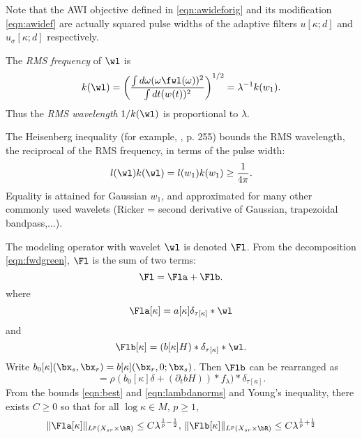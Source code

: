 Note that the AWI objective defined in \ref{eqn:awideforig} and its
modification \ref{eqn:awidef} are actually
squared pulse widths of the adaptive filters $u[\kappa;d]$ and
$u_{\sigma}[\kappa;d]$ respectively.

The {\em RMS frequency} of $\wl$ is
\begin{equation}
  \label{eqn:freq}
  k(\wl) = \left(\frac{\int d\omega (\omega \fwl(\omega))^2}{\int dt (w(t))^2} \right)^{1/2} = \lambda^{-1}k(w_1).
\end{equation}
Thus the {\em RMS wavelength} $1/k(\wl)$ is proportional to $\lambda$.

The Heisenberg inequality (for example, \cite{Folland:07}, p. 255) bounds the RMS
wavelength, the reciprocal of the RMS frequency, in terms of the pulse
width:
\begin{equation}
  \label{eqn:heis}
  l(\wl) k(\wl) = l(w_1)k(w_1) \ge \frac{1}{4\pi}.
\end{equation}
Equality is attained for Gaussian $w_1$, and approximated for many other
commonly used wavelets (Ricker = second derivative of Gaussian,
trapezoidal bandpass,...).

The modeling operator with wavelet $\wl$ is denoted $\Fl$. From the
decomposition \ref{eqn:fwdgreen}, $\Fl$ is the sum of two terms:
\begin{equation}
  \label{eqn:Flamdecomp}
  \Fl = \Fla + \Flb.
\end{equation}
where
\begin{equation}
  \label{eqn:Fl0}
  \Fla[\kappa]= a[\kappa]\delta_{\tau[\kappa]}*\wl
\end{equation}
and
\[
\Flb[\kappa] = (b[\kappa]H) *\delta_{\tau[\kappa]}*\wl.
\]
Write $b_0[\kappa](\bx_s,\bx_r) = b[\kappa](\bx_r,0;\bx_s)$. Then
$\Flb$ can be rearranged as
\begin{equation}
  \label{eqn:Fl1}
  =\rho (b_0[\kappa]\delta + (\partial_t b H)) * f_{\lambda} )*\delta_{\tau[\kappa]}.
\end{equation}
From the bounds \ref{eqn:best} and \ref{eqn:lambdanorms} and Young's
inequality, there exists $C \ge 0$ so that for all $\log \kappa \in M$, $p
\ge 1$,
\begin{equation}
  \label{eqn:Frembd}
 \|\Fla[\kappa]\|_{ L^p(X_{sr} \times \bR)} \le C\lambda^{\frac{1}{p}-\frac{1}{2}},\,\|\Flb[\kappa]\|_{ L^p(X_{sr} \times \bR)} \le C\lambda^{\frac{1}{p}+\frac{1}{2}}
\end{equation}

